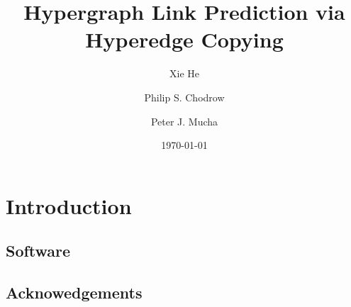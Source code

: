 \documentclass[10pt]{amsart}
\title{Hypergraph Link Prediction via Hyperedge Copying}
\date{\today}
\author{Xie He}
\author{Philip S. Chodrow}
\author{Peter J. Mucha}
\begin{document}
 

\maketitle



\begin{abstract}
    
\end{abstract} 


\section*{Introduction}



\subsection*{Software}



\subsection*{Acknowedgements}





\newpage

\appendix




\end{document}
